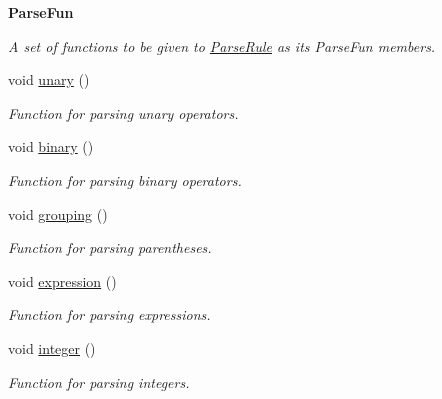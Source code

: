 \begin{Indent}\textbf{ Parse\+Fun}\par
{\em A set of functions to be given to \hyperlink{struct_compiler_1_1_parse_rule}{Parse\+Rule} as its Parse\+Fun members. }\begin{DoxyCompactItemize}
\item 
\mbox{\label{class_compiler_af3997786e54f41aadbf60499aacfe5bf}} 
void \hyperlink{class_compiler_af3997786e54f41aadbf60499aacfe5bf}{unary} ()
\begin{DoxyCompactList}\small\item\em Function for parsing unary operators. \end{DoxyCompactList}\item 
\mbox{\label{class_compiler_a002356854483346c034da5bafefb48d1}} 
void \hyperlink{class_compiler_a002356854483346c034da5bafefb48d1}{binary} ()
\begin{DoxyCompactList}\small\item\em Function for parsing binary operators. \end{DoxyCompactList}\item 
\mbox{\label{class_compiler_a74dad7480281bdc9070b76bad1bf3767}} 
void \hyperlink{class_compiler_a74dad7480281bdc9070b76bad1bf3767}{grouping} ()
\begin{DoxyCompactList}\small\item\em Function for parsing parentheses. \end{DoxyCompactList}\item 
\mbox{\label{class_compiler_a23ce9691f436cf7d6bbb49d3f24dd4b3}} 
void \hyperlink{class_compiler_a23ce9691f436cf7d6bbb49d3f24dd4b3}{expression} ()
\begin{DoxyCompactList}\small\item\em Function for parsing expressions. \end{DoxyCompactList}\item 
\mbox{\label{class_compiler_abee097035a577ddf2ce1742c9d63b3cd}} 
void \hyperlink{class_compiler_abee097035a577ddf2ce1742c9d63b3cd}{integer} ()
\begin{DoxyCompactList}\small\item\em Function for parsing integers. \end{DoxyCompactList}\item 

\end{DoxyCompactItemize}
\end{Indent}
